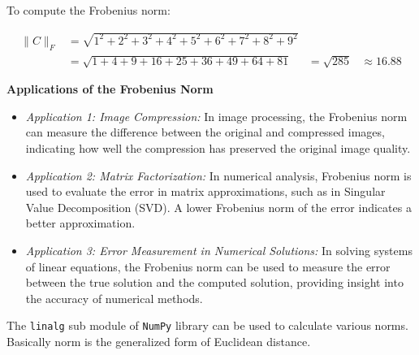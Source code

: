 \documentclass[
  letterpaper,
  DIV=11,
  numbers=noendperiod]{scrreprt}
\theoremstyle{plain}
\theoremstyle{definition}
\theoremstyle{remark}
\begin{document}
To compute the Frobenius norm:

\begin{align*}
\|C\|_F &= \sqrt{1^2 + 2^2 + 3^2 + 4^2 + 5^2 + 6^2 + 7^2 + 8^2 + 9^2}\\
&= \sqrt{1 + 4 + 9 + 16 + 25 + 36 + 49 + 64 + 81}
&= \sqrt{285}
&\approx 16.88
\end{align*}

\textbf{Applications of the Frobenius Norm}

\begin{itemize}
\item
  \emph{Application 1: Image Compression:} In image processing, the
  Frobenius norm can measure the difference between the original and
  compressed images, indicating how well the compression has preserved
  the original image quality.
\item
  \emph{Application 2: Matrix Factorization:} In numerical analysis,
  Frobenius norm is used to evaluate the error in matrix approximations,
  such as in Singular Value Decomposition (SVD). A lower Frobenius norm
  of the error indicates a better approximation.
\item
  \emph{Application 3: Error Measurement in Numerical Solutions:} In
  solving systems of linear equations, the Frobenius norm can be used to
  measure the error between the true solution and the computed solution,
  providing insight into the accuracy of numerical methods.
\end{itemize}

The \texttt{linalg} sub module of \texttt{NumPy} library can be used to
calculate various norms. Basically norm is the generalized form of
Euclidean distance.
\end{document}
